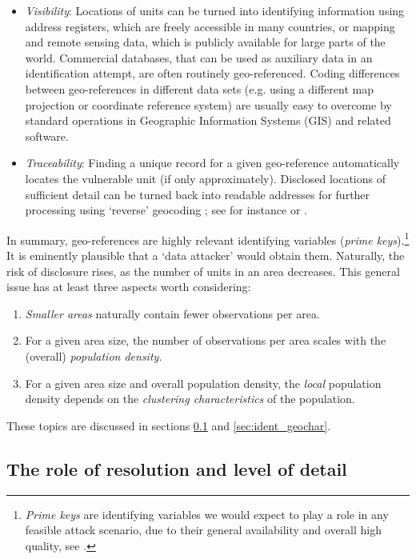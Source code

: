\begin{itemize}
    \item \emph{Visibility}: Locations of units can be turned into identifying information using address registers, which are freely accessible in many countries, or mapping and remote sensing data, which is publicly available for large parts of the world. Commercial databases, that can be used as auxiliary data in an identification attempt, are often routinely geo-referenced. Coding differences between geo-references in different data sets (e.g. using a different map projection or coordinate reference system) are usually easy to overcome by standard operations in Geographic Information Systems (GIS) and related software.
    \item \emph{Traceability}: Finding a unique record for a given geo-reference automatically locates the vulnerable unit (if only approximately). Disclosed locations of sufficient detail can be turned back into readable addresses for further processing using `reverse' geocoding \citep{OwusuEtAl2017}; see for instance \cite{BrownsteinEtAl2006} or \cite{CurtisEtAl2006}.
\end{itemize}

In summary, geo-references are highly relevant identifying variables (\emph{prime keys}).\footnote{
    \emph{Prime keys} are identifying variables we would expect to play a role in any feasible attack scenario, due to their general availability and overall high quality, see \cite{ElliotDale1999}.} 
It is eminently plausible that a `data attacker' would obtain them. 
Naturally, the risk of disclosure rises, as the number of units in an area decreases. This general issue has at least three aspects worth considering:  
\begin{enumerate}
    \item \emph{Smaller areas} naturally contain fewer observations per area.
    \item For a given area size, the number of observations per area scales with the (overall) \emph{population density}.
    \item For a given area size and overall population density, the \emph{local} population density depends on the \emph{clustering characteristics} of the population.
\end{enumerate}
These topics are discussed in sections \ref{sec:ident_detail} and \ref{sec:ident_geochar}.

\subsection{The role of resolution and level of detail} \label{sec:ident_detail}


